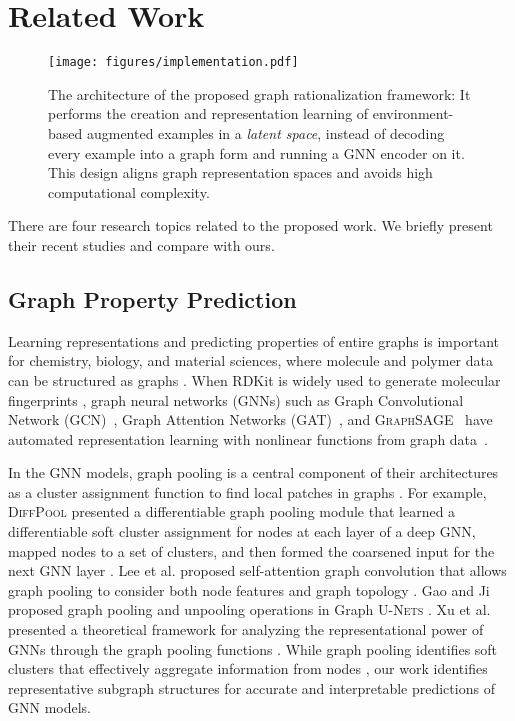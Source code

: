 \documentclass[sigconf]{acmart}
\begin{document}
\section{Related Work}
\label{sec:related}
\begin{figure*}[t]
    \centering
    \texttt{[image: figures/implementation.pdf]}
    \vspace{-0.15in}
    \caption{The architecture of the proposed graph rationalization framework: It performs the creation and representation learning of environment-based augmented examples in a \emph{latent space}, instead of decoding every example into a graph form and running a GNN encoder on it. This design aligns graph representation spaces and avoids high computational complexity.}
    \label{fig:implementation}
    \vspace{-0.1in}
\end{figure*}

There are four research topics related to the proposed work. We briefly present their recent studies and compare with ours.

\subsection{Graph Property Prediction}

Learning representations and predicting properties of entire graphs is important for chemistry, biology, and material sciences, where molecule and polymer data can be structured as graphs \cite{hu2020open}.
When RDKit is widely used to generate molecular fingerprints \cite{landrum2013rdkit}, 
graph neural networks (GNNs) such as Graph Convolutional Network (GCN)~\cite{kipf2017semi}, Graph Attention Networks (GAT)~\cite{velivckovic2018graph}, and \textsc{GraphSAGE}~\cite{hamilton2017inductive} have automated representation learning with nonlinear functions from graph data~\cite{zhang2020deep,wu2020comprehensive,ma2021unified,wang2020calendar,wang2021dynamic,wang2021modeling,wang2021modeling_tkde,zhao2021synergistic,jiang2022federated}.

In the GNN models, graph pooling is a central component of their architectures as a cluster assignment function to find local patches in graphs \cite{mesquita2020rethinking}.
For example, \textsc{DiffPool} presented a differentiable graph pooling module that learned a differentiable soft cluster assignment for nodes at each layer of a deep GNN, mapped nodes to a set of clusters, and then formed the coarsened input for the next GNN layer \cite{ying2018hierarchical}. Lee et al. proposed self-attention graph convolution that allows graph pooling to consider both node features and graph topology \cite{lee2019self}. Gao and Ji proposed graph pooling and unpooling operations in Graph \textsc{U-Nets} \cite{gao2021graph}. Xu et al. presented a theoretical framework for analyzing the representational power of GNNs through the graph pooling functions \cite{xu2018how}. While graph pooling identifies soft clusters that effectively aggregate information from nodes \cite{ying2019gnnexplainer}, our work identifies representative subgraph structures for accurate and interpretable predictions of GNN models.
\end{document}
